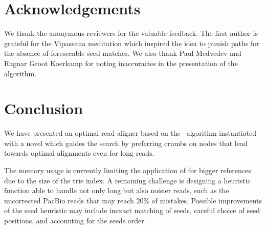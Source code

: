 \section{Acknowledgements}
%
We thank the anonymous reviewers for the valuable feedback. The first author is
grateful for the Vipassana meditation which inspired the idea to punish paths
for the absence of foreseeable seed matches. We also thank Paul Medvedev and
Ragnar Groot Koerkamp for noting inaccuracies in the presentation of the
algorithm.

\section{Conclusion}
%
We have presented an optimal read aligner based on the \A~algorithm instantiated
with a novel \seedh which guides the search by preferring crumbs on nodes that lead
towards optimal alignments even for long reads.

The memory usage is currently limiting the application of \astarix for bigger
references due to the size of the trie index. A remaining challenge is designing
a heuristic function able to handle not only long but also noisier reads, such
as the uncorrected PacBio reads that may reach 20\% of mistakes. Possible
improvements of the seed heuristic may include inexact matching of seeds,
careful choice of seed positions, and accounting for the seeds order.
